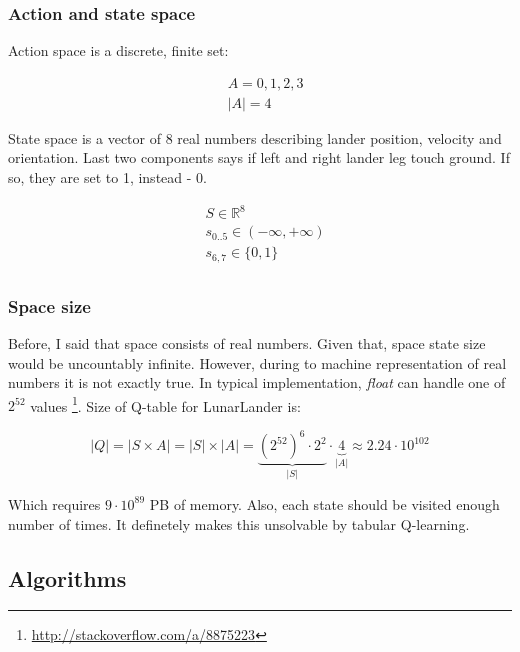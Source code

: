 \documentclass[12pt]{article}
\begin{document}
\subsubsection{Action and state space}

Action space is a discrete, finite set:

\begin{equation}
\begin{aligned}
&A = {0,1,2,3} \\
&|A| = 4
\end{aligned}
\end{equation}

State space is a vector of 8 real numbers describing lander position, velocity and orientation. Last two components says if left and right lander leg touch ground. If so, they are set to 1, instead - 0.

\begin{equation}
\begin{aligned}
&S \in \mathbb{R}^8 \\
&s_{0..5} \in (-\infty, +\infty) \\
&s_{6,7} \in \{0,1\} \\
\end{aligned}
\end{equation}

\subsubsection{Space size}

Before, I said that space consists of real numbers. Given that, space state size  would be uncountably infinite. However, during to machine representation of real numbers it is not exactly true. In typical implementation, \emph{float} can handle one of $2^{52}$ values \footnote{\url{http://stackoverflow.com/a/8875223}}. Size of Q-table for LunarLander is:

\begin{equation}
|Q| = |S \times A| = |S| \times |A| = \underbrace{{(2^{52})}^6 \cdot 2^2}_{|S|} \cdot \underbrace{4}_{|A|} \approx 2.24 \cdot 10^{102}
\end{equation}

Which requires $9 \cdot 10^{89}$ PB of memory. Also, each state should be visited enough number of times. It definetely makes this unsolvable by tabular Q-learning.

\subsection{Algorithms}
\end{document}
